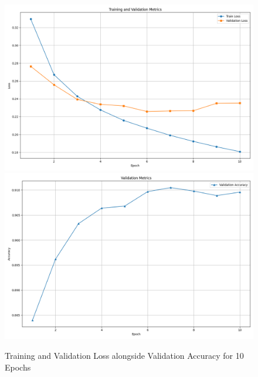 \begin{figure}[H]
    \centering
    \includegraphics[scale=0.35]{images/10EpochTrainValLoss.png}
    \includegraphics[scale=0.35]{images/10EpochValAcc.png}
    \caption{Training and Validation Loss alongside Validation Accuracy for 10 Epochs}
    \label{fig: 10epoch Metrics}
\end{figure}

